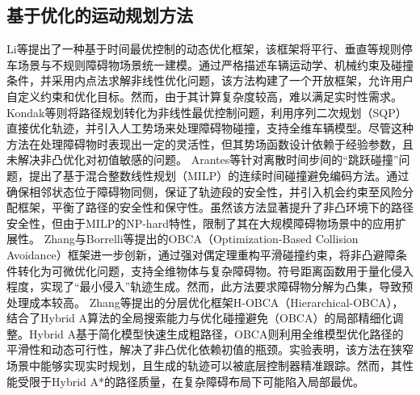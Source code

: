 \documentclass[master,academic]{ysuthesis} %
\begin{document}
		\subsection{基于优化的运动规划方法}
		Li等提出了一种基于时间最优控制的动态优化框架，该框架将平行、垂直等规则停车场景与不规则障碍物场景统一建模。通过严格描述车辆运动学、机械约束及碰撞条件，并采用内点法求解非线性优化问题，该方法构建了一个开放框架，允许用户自定义约束和优化目标。然而，由于其计算复杂度较高，难以满足实时性需求。
		Kondak等则将路径规划转化为非线性最优控制问题，利用序列二次规划（SQP）直接优化轨迹，并引入人工势场来处理障碍物碰撞，支持全维车辆模型。尽管这种方法在处理障碍物时表现出一定的灵活性，但其势场函数设计依赖于经验参数，且未解决非凸优化对初值敏感的问题。
		Arantes等针对离散时间步间的“跳跃碰撞”问题，提出了基于混合整数线性规划（MILP）的连续时间碰撞避免编码方法。通过确保相邻状态位于障碍物同侧，保证了轨迹段的安全性，并引入机会约束至风险分配框架，平衡了路径的安全性和保守性。虽然该方法显著提升了非凸环境下的路径安全性，但由于MILP的NP-hard特性，限制了其在大规模障碍物场景中的应用扩展性。
		Zhang与Borrelli等提出的OBCA（Optimization-Based Collision Avoidance）框架进一步创新，通过强对偶定理重构平滑碰撞约束，将非凸避障条件转化为可微优化问题，支持全维物体与复杂障碍物。符号距离函数用于量化侵入程度，实现了“最小侵入”轨迹生成。然而，此方法要求障碍物分解为凸集，导致预处理成本较高。
		Zhang等提出的分层优化框架H-OBCA（Hierarchical-OBCA），结合了Hybrid A算法的全局搜索能力与优化碰撞避免（OBCA）的局部精细化调整。Hybrid A基于简化模型快速生成粗路径，OBCA则利用全维模型优化路径的平滑性和动态可行性，解决了非凸优化依赖初值的瓶颈。实验表明，该方法在狭窄场景中能够实现实时规划，且生成的轨迹可以被底层控制器精准跟踪。然而，其性能受限于Hybrid A*的路径质量，在复杂障碍布局下可能陷入局部最优。
\end{document}
